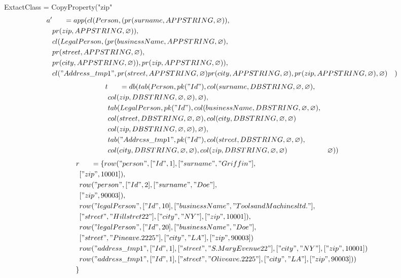 \documentclass[11pt]{article}
\begin{document}
\newpage
ExtactClass = CopyProperty("zip"
\begin{align*}
a' & \;\;\;\;\;\; =app(cl(Person, (pr(surname, APPSTRING, \varnothing)), \\
& pr(zip, APPSTRING, \varnothing)), \\
& cl(LegalPerson, (pr(businessName, APPSTRING, \varnothing), \\
& pr(street, APPSTRING, \varnothing), \\
& pr(city, APPSTRING, \varnothing)), pr(zip, APPSTRING, \varnothing)), \\
& cl("Address\_tmp1", pr(street, APPSTRING, \varnothing) pr(city, APPSTRING, \varnothing), pr(zip, APPSTRING, \varnothing), \varnothing)
& )
\end{align*}
\begin{align*}
t & \;\;\;\;\;\; =db(tab(Person, pk("Id"), col(surname, DBSTRING, \varnothing, \varnothing), \\
& col(zip, DBSTRING, \varnothing, \varnothing), \varnothing), \\
& tab(LegalPerson, pk("Id"),  col(businessName, DBSTRING, \varnothing, \varnothing), \\
& col(street, DBSTRING, \varnothing, \varnothing), col(city, DBSTRING, \varnothing, \varnothing) \\
& col(zip, DBSTRING, \varnothing, \varnothing), \varnothing), \\
& tab("Address\_tmp1", pk("Id"), col(street, DBSTRING, \varnothing, \varnothing),\\
& col(city, DBSTRING, \varnothing, \varnothing), col(zip, DBSTRING, \varnothing, \varnothing)
& \varnothing)) 
\end{align*}
\begin{align*}
r & \;\;\;\;\;\; =\{ row("person", ["Id", 1], ["surname", "Griffin"], \\
& ["zip", 10001]), \\
& row("person", ["Id", 2], ["surname", "Doe"], \\
& ["zip", 90003]), \\
& row("legalPerson", ["Id", 10], ["businessName", "Tools and Machines ltd."], \\
& ["street", "Hill stret 22"], ["city", "NY"], ["zip", 10001]), \\
& row("legalPerson", ["Id", 20], ["businessName", "Doe"], \\
& ["street", "Pine ave. 2225"], ["city", "LA"], ["zip", 90003])\\
& row("address\_tmp1", ["Id", 1], ["street", "S. Mary Evenue 22"], ["city", "NY"], ["zip", 10001]) \\
& row("address\_tmp1", ["Id", 1], ["street", "Olive ave. 2225"], ["city", "LA"], ["zip", 90003]) )\\
\}
\end{align*}
\end{document}
